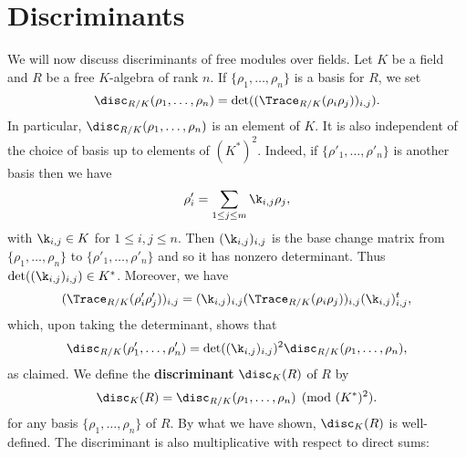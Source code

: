   \section{Discriminants}
    We will now discuss discriminants of free modules over fields. Let $K$ be a field and $R$ be a free $K$-algebra of rank $n$. If $\{\rho_{1},\ldots,\rho_{n}\}$ is a basis for $R$, we set
    \[
      \disc_{R/K}(\rho_{1},\ldots,\rho_{n}) = \det((\Trace_{R/K}(\rho_{i}\rho_{j}))_{i,j}).
    \]
    In particular, $\disc_{R/K}(\rho_{1},\ldots,\rho_{n})$ is an element of $K$. It is also independent of the choice of basis up to elements of $(K^{\ast})^{2}$. Indeed, if $\{\rho'_{1},\ldots,\rho'_{n}\}$ is another basis then we have
    \[
      \rho'_{i} = \sum_{1 \le j \le m}\k_{i,j}\rho_{j},
    \]
    with $\k_{i,j} \in K$ for $1 \le i,j \le n$. Then $(\k_{i,j})_{i,j}$ is the base change matrix from $\{\rho_{1},\ldots,\rho_{n}\}$ to $\{\rho'_{1},\ldots,\rho'_{n}\}$ and so it has nonzero determinant. Thus $\det((\k_{i,j})_{i,j}) \in K^{\ast}$. Moreover, we have
    \[
      (\Trace_{R/K}(\rho'_{i}\rho'_{j}))_{i,j} = (\k_{i,j})_{i,j}(\Trace_{R/K}(\rho_{i}\rho_{j}))_{i,j}(\k_{i,j})_{i,j}^{t},
    \]
    which, upon taking the determinant, shows that
    \begin{equation}\label{equ:discriminant_base_change}
      \disc_{R/K}(\rho'_{1},\ldots,\rho'_{n}) = \det((\k_{i,j})_{i,j})^{2}\disc_{R/K}(\rho_{1},\ldots,\rho_{n}),
    \end{equation}
    as claimed. We define the \textbf{discriminant} $\disc_{K}(R)$ of $R$ by
    \[
      \disc_{K}(R) = \disc_{R/K}(\rho_{1},\ldots,\rho_{n}) \pmod{(K^{\ast})^{2}}.
    \]
    for any basis $\{\rho_{1},\ldots,\rho_{n}\}$ of $R$. By what we have shown, $\disc_{K}(R)$ is well-defined. The discriminant is also multiplicative with respect to direct sums:

